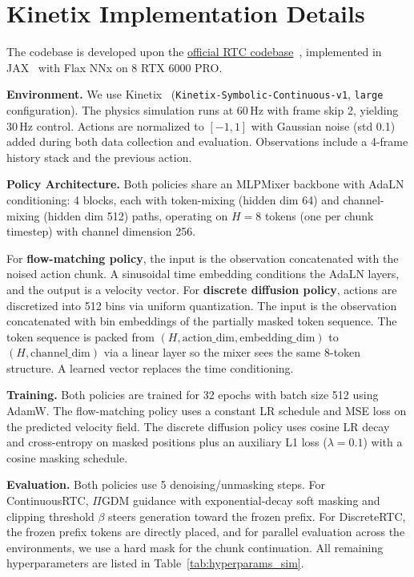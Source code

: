 \documentclass{article}
\begin{document}
\newpage
\section{Kinetix Implementation Details}
\label{app: simexp}
The codebase is developed upon the \href{https://github.com/Physical-Intelligence/real-time-chunking-kinetix}{official RTC codebase}~\citep{black2025real}, implemented in JAX~\citep{jax2018github} with Flax NNx on 8 RTX 6000 PRO.

\textbf{Environment.}
We use Kinetix~\citep{matthews2024kinetix} (\texttt{Kinetix-Symbolic-Continuous-v1}, \texttt{large} configuration).
The physics simulation runs at 60\,Hz with frame skip 2, yielding 30\,Hz control.
Actions are normalized to $[-1, 1]$ with Gaussian noise (std 0.1) added during both data collection and evaluation.
Observations include a 4-frame history stack and the previous action.

\textbf{Policy Architecture.}
Both policies share an MLPMixer backbone with AdaLN conditioning: 4 blocks, each with token-mixing (hidden dim 64) and channel-mixing (hidden dim 512) paths, operating on $H{=}8$ tokens (one per chunk timestep) with channel dimension 256.

For \textbf{flow-matching policy}, the input is the observation concatenated with the noised action chunk.
A sinusoidal time embedding conditions the AdaLN layers, and the output is a velocity vector.
For \textbf{discrete diffusion policy}, actions are discretized into 512 bins via uniform quantization.
The input is the observation concatenated with bin embeddings of the partially masked token sequence.
The token sequence is packed from $(H, \text{action\_dim}, \text{embedding\_dim})$ to $(H, \text{channel\_dim})$ via a linear layer so the mixer sees the same 8-token structure.
A learned vector replaces the time conditioning.

\textbf{Training.}
Both policies are trained for 32 epochs with batch size 512 using AdamW.
The flow-matching policy uses a constant LR schedule and MSE loss on the predicted velocity field.
The discrete diffusion policy uses cosine LR decay and cross-entropy on masked positions plus an auxiliary L1 loss ($\lambda{=}0.1$) with a cosine masking schedule.

\textbf{Evaluation.}
Both policies use 5 denoising/unmasking steps.
For ContinuousRTC, $\Pi$GDM guidance with exponential-decay soft masking and clipping threshold $\beta$ steers generation toward the frozen prefix.
For DiscreteRTC, the frozen prefix tokens are directly placed, and for parallel evaluation across the environments, we use a hard mask for the chunk continuation.
All remaining hyperparameters are listed in Table~\ref{tab:hyperparams_sim}.
\end{document}
